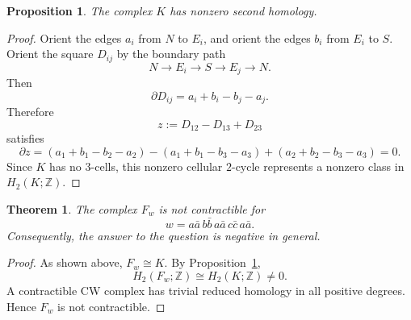 \documentclass[11pt]{article}
\newtheorem{theorem}{Theorem}
\newtheorem{proposition}{Proposition}
\begin{document}
\begin{proposition}\label{prop:h2}
The complex \(K\) has nonzero second homology.
\end{proposition}

\begin{proof}
Orient the edges \(a_i\) from \(N\) to \(E_i\), and orient the edges \(b_i\) from \(E_i\) to \(S\).  Orient the square \(D_{ij}\) by the boundary path
\[
N\longrightarrow E_i\longrightarrow S\longrightarrow E_j\longrightarrow N.
\]
Then
\[
\partial D_{ij}=a_i+b_i-b_j-a_j.
\]
Therefore
\[
z:=D_{12}-D_{13}+D_{23}
\]
satisfies
\[
\partial z
=
(a_1+b_1-b_2-a_2)
-(a_1+b_1-b_3-a_3)
+(a_2+b_2-b_3-a_3)
=0.
\]
Since \(K\) has no \(3\)-cells, this nonzero cellular \(2\)-cycle represents a nonzero class in \(H_2(K;\mathbb Z)\).
\end{proof}

\begin{theorem}
The complex \(F_w\) is not contractible for
\[
w=a\bar a\, b\bar b\, a\bar a\, c\bar c\, a\bar a.
\]
Consequently, the answer to the question is negative in general.
\end{theorem}

\begin{proof}
As shown above, \(F_w\cong K\).  By Proposition~\ref{prop:h2},
\[
H_2(F_w;\mathbb Z)\cong H_2(K;\mathbb Z)\neq 0.
\]
A contractible CW complex has trivial reduced homology in all positive degrees.  Hence \(F_w\) is not contractible.
\end{proof}
\end{document}
